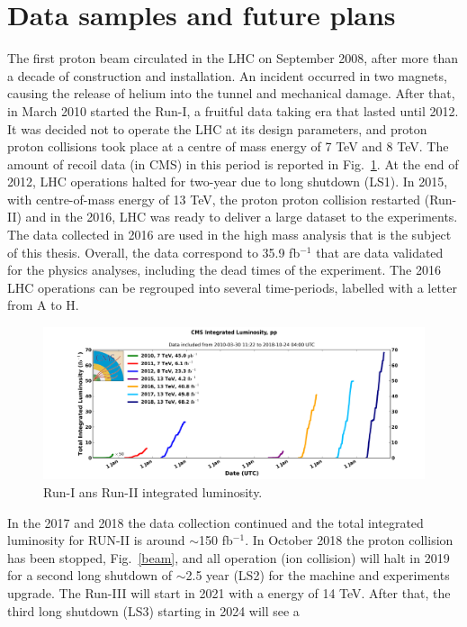 \section{Data samples and future plans}
The first proton beam circulated in the LHC on September 2008, after more than a decade of construction and installation.
An incident occurred in two magnets, causing the release of helium into the tunnel
and mechanical damage. After that, in March  2010 started the Run-I, a fruitful data taking era that lasted until
2012.  It was decided not to operate the LHC at its design parameters, and proton proton collisions
took place at a centre of mass energy of 7 TeV and 8 TeV. The amount of recoil data (in CMS) in this period is reported in Fig.~\ref{int_lumi_cumulative_pp_1}.
At the end of 2012, LHC operations halted for two-year due to long shutdown (LS1).
In 2015, with centre-of-mass energy of 13 TeV, the proton proton collision restarted (Run-II) and in the 2016,  LHC was ready to deliver a large dataset to the experiments.
The data collected in 2016 are used in the high mass analysis that is
the subject of this thesis. Overall, the data correspond to 35.9
fb$^{-1}$ that are data validated for the physics analyses, including
the  dead times of the experiment. The 2016 LHC operations can be
regrouped into several time-periods,  
labelled with a letter from A to H.
\begin{figure}
\centering
\includegraphics[scale= 0.4]{../Cap2/int_lumi_cumulative_pp_1}
\caption{Run-I ans Run-II integrated luminosity.}
\label{int_lumi_cumulative_pp_1}
\end{figure}
In the 2017 and 2018 the data collection continued and the total integrated luminosity for RUN-II is around $\sim$150 fb$^{-1}$. 
In October 2018 the proton collision has been stopped, Fig.~\ref{beam}, and all operation (ion collision) will  halt in 2019 for a second long shutdown of $\sim$2.5 year (LS2) for the machine and experiments upgrade. The Run-III will start in 2021 with a energy of 14 TeV.
After that, the third long shutdown (LS3) starting in 2024 will see a

